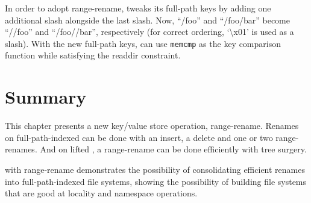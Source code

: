 In order to adopt range-rename, \betrfs tweaks its full-path keys by adding one
additional slash alongside the last slash.
Now, ``/foo'' and ``/foo/bar'' become ``//foo'' and ``/foo//bar'', respectively
(for correct ordering, `\textbackslash x01' is used as a slash).
With the new full-path keys, \betrfs can use \texttt{memcmp} as the key
comparison function while satisfying the readdir constraint.


\section{Summary}

This chapter presents a new key/value store operation, range-rename.
Renames on full-path-indexed \betrfs can be done with an insert, a delete and
one or two range-renames.
And on lifted \bets, a range-rename can be done efficiently with tree surgery.

\betrfs with range-rename demonstrates the possibility of consolidating
efficient renames into full-path-indexed file systems, showing the possibility
of building file systems that are good at locality and namespace operations.

